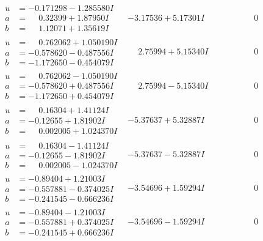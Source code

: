 \documentclass[1p]{elsarticle_modified}
\theoremstyle{definition}
\begin{document}
$$\begin{array}{c|c|c}
\begin{aligned}
u &= -0.171298 - 1.285580 I \\
a &= \phantom{-}0.32399 + 1.87950 I \\
b &= \phantom{-}1.12071 + 1.35619 I\end{aligned}
 & -3.17536 + 5.17301 I & \phantom{-0.000000 } 0 \\ \hline\begin{aligned}
u &= \phantom{-}0.762062 + 1.050190 I \\
a &= -0.578620 - 0.487556 I \\
b &= -1.172650 - 0.454079 I\end{aligned}
 & \phantom{-}2.75994 + 5.15340 I & \phantom{-0.000000 } 0 \\ \hline\begin{aligned}
u &= \phantom{-}0.762062 - 1.050190 I \\
a &= -0.578620 + 0.487556 I \\
b &= -1.172650 + 0.454079 I\end{aligned}
 & \phantom{-}2.75994 - 5.15340 I & \phantom{-0.000000 } 0 \\ \hline\begin{aligned}
u &= \phantom{-}0.16304 + 1.41124 I \\
a &= -0.12655 + 1.81902 I \\
b &= \phantom{-}0.002005 + 1.024370 I\end{aligned}
 & -5.37637 + 5.32887 I & \phantom{-0.000000 } 0 \\ \hline\begin{aligned}
u &= \phantom{-}0.16304 - 1.41124 I \\
a &= -0.12655 - 1.81902 I \\
b &= \phantom{-}0.002005 - 1.024370 I\end{aligned}
 & -5.37637 - 5.32887 I & \phantom{-0.000000 } 0 \\ \hline\begin{aligned}
u &= -0.89404 + 1.21003 I \\
a &= -0.557881 - 0.374025 I \\
b &= -0.241545 - 0.666236 I\end{aligned}
 & -3.54696 + 1.59294 I & \phantom{-0.000000 } 0 \\ \hline\begin{aligned}
u &= -0.89404 - 1.21003 I \\
a &= -0.557881 + 0.374025 I \\
b &= -0.241545 + 0.666236 I\end{aligned}
 & -3.54696 - 1.59294 I & \phantom{-0.000000 } 0 \\ \hline\begin{aligned}

\end{aligned}
\end{array}$$
\end{document}
